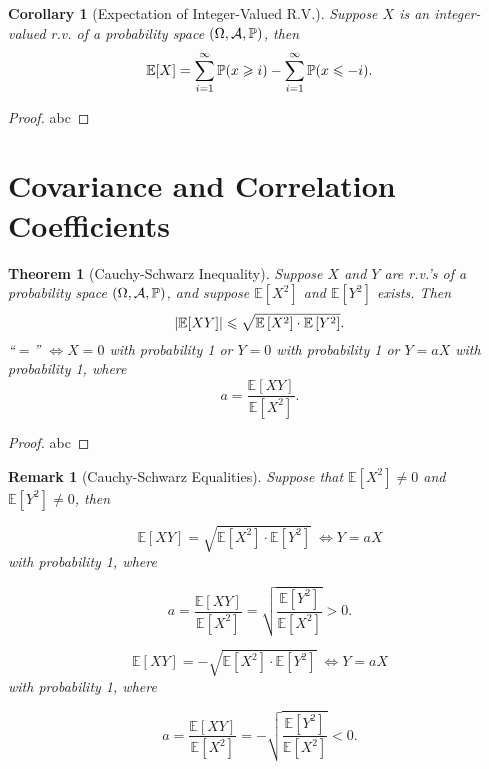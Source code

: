 \documentclass[openany,12pt]{book}
\newtheorem{theorem}{Theorem}[chapter]
\newtheorem{corollary}{Corollary}[chapter]
\newtheorem{remark}{Remark}[chapter]
\begin{document}
\begin{corollary}[Expectation of Integer-Valued R.V.]
Suppose $X$ is an integer-valued r.v. of a probability space $(\Omega,\mathcal{A},\mathbb{P})$, then
\[\mathbb{E}[X] = \sum_{i = 1}^{\infty}{\mathbb{P}(x \geqslant i)} - \sum_{i = 1}^{\infty}{\mathbb{P}( x \leqslant - i )}.\]
\end{corollary}

\begin{proof}
  abc
\end{proof}

\section{Covariance and Correlation Coefficients}

\begin{theorem}[Cauchy-Schwarz Inequality]
Suppose $X$ and $Y$ are r.v.'s of a probability space $(\Omega,\mathcal{A},\mathbb{P})$, and suppose $\mathbb{E}[ X^{2}]$ and $\mathbb{E}[ Y^{2}]$
exists. Then
\[\left| \mathbb{E}[XY] \right| \leqslant \sqrt{\mathbb{E}\left[ X^{2} \right] \cdot \mathbb{E}\left[ Y^{2} \right]}.\]
``$=$''  $\Leftrightarrow X = 0$ with probability 1 or $Y = 0$ with probability 1 or $Y = aX$ with probability 1, where
\[a = \frac{\mathbb{E}[XY]}{\mathbb{E}\left[ X^{2} \right]}.\]
\end{theorem}

\begin{proof}
  abc
\end{proof}

\begin{remark}[Cauchy-Schwarz Equalities]
Suppose that $\mathbb{E}[ X^{2}] \neq 0$ and $\mathbb{E}[ Y^{2}] \neq 0$, then

\[\mathbb{E}[XY]= \sqrt{\mathbb{E}\left[ X^{2} \right] \cdot \mathbb{E}\left[ Y^{2} \right]}\  \Leftrightarrow Y = aX\]
with probability 1, where

\[a = \frac{\mathbb{E}[XY]}{\mathbb{E}\left[ X^{2} \right]} = \sqrt{\frac{\mathbb{E}\left[ Y^{2} \right]}{\mathbb{E}\left[ X^{2} \right]}} > 0.\]

\[\mathbb{E}[XY]= - \sqrt{\mathbb{E}\left[ X^{2} \right] \cdot \mathbb{E}\left[ Y^{2} \right]}\  \Leftrightarrow Y = aX\]
with probability 1, where

\[a = \frac{\mathbb{E}[XY]}{\mathbb{E}\left[ X^{2} \right]} = - \sqrt{\frac{\mathbb{E}\left[ Y^{2} \right]}{\mathbb{E}\left[ X^{2} \right]}} < 0.\]

\end{remark}
\end{document}
